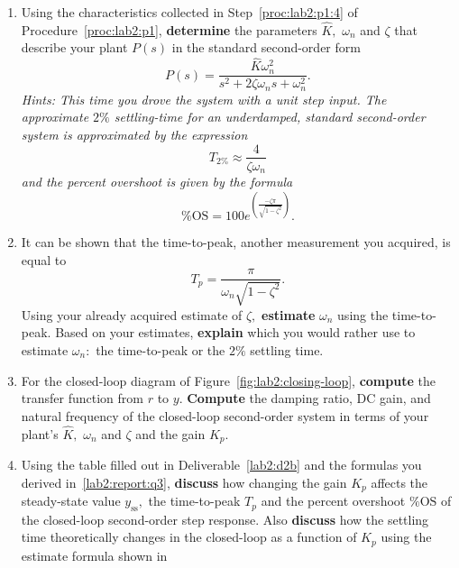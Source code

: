 \begin{deliverable}[label={lab2:report}]
  \begin{enumerate}[label={(\arabic*)}]
    \item{
      Using the characteristics collected in Step~\ref{proc:lab2:p1:4} of
      Procedure~\ref{proc:lab2:p1}, \textbf{determine} the parameters
      \(\hat{K},\) \(\omega_n\) and \(\zeta\) that describe your plant \(P(s)\)
      in the standard second-order form
      \[
        P(s) = \frac{\hat{K} \omega_n^2}{s^2 + 2 \zeta \omega_n s + \omega_n^2}
        .
      \]
      \emph{Hints: This time you drove the system with a unit
      step input.
      The approximate \(2\%\) settling-time for an
      underdamped, standard second-order system is approximated by the expression
      \[
        T_{2\%} \approx \frac{4}{\zeta \omega_n}
      \]
      and the percent overshoot is given by the formula
      \[
        \%\mathrm{OS} = 100 e^{\left(
          \frac{-\zeta \pi}{\sqrt{1-\zeta^2}}
        \right)}.
      \]
      }
      \label{lab2:report:q1}
    }
    \item{
      It can be shown that the time-to-peak, another measurement you
      acquired, is equal to
      \[
        T_p = \frac{\pi}{\omega_n \sqrt{1-\zeta^2}}.
      \]
      Using your already acquired estimate of \(\zeta,\) \textbf{estimate}
      \(\omega_n\) using the time-to-peak.
      Based on your estimates, \textbf{explain} which you would rather use to
      estimate \(\omega_n:\) the time-to-peak or the \(2\%\) settling time.
      \label{lab2:report:q2}
    }
    \item{
      For the closed-loop diagram of Figure~\ref{fig:lab2:closing-loop},
      \textbf{compute} the transfer function from \(r\) to \(y.\)
      \textbf{Compute} the damping ratio, DC gain, and natural frequency of the
      closed-loop second-order system in terms of your plant's
      \(\hat{K},\) \(\omega_n\) and \(\zeta\) and the gain \(K_p.\)
      \label{lab2:report:q3}
    }
    \item{
      Using the table filled out in Deliverable~\ref{lab2:d2b} and the
      formulas you derived in~\ref{lab2:report:q3},
      \textbf{discuss} how changing the
      gain \(K_p\) affects the steady-state value \(y_\mathrm{ss},\) the
      time-to-peak \(T_p\) and the percent overshoot \(\%\mathrm{OS}\)
      of the closed-loop second-order step response.
      Also \textbf{discuss} how the settling time theoretically changes in the
      closed-loop as a function of \(K_p\) using the estimate formula shown in
}
\end{enumerate}
\end{deliverable}

